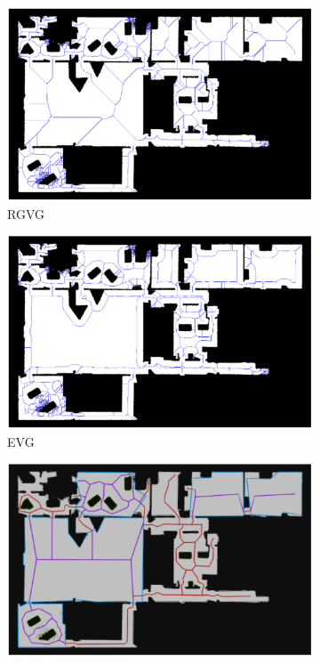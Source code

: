 \begin{figure}[h]
    \captionsetup[subfigure]{justification=centering}
    \centering
    \begin{subfigure}{.5\textwidth}
      \centering
      \includegraphics[width=\textwidth]{figures/60_results/hou2_roadmap_RGVG.png}
      \caption{RGVG \cite{beeson_towards_2005}}
    \end{subfigure}%
    \begin{subfigure}{.5\textwidth}
      \centering
      \includegraphics[width=\textwidth]{figures/60_results/hou2_roadmap_evg.png}
      \caption{EVG \cite{beeson_towards_2005}}
    \end{subfigure}
    \begin{subfigure}{.5\textwidth}
      \centering
      \includegraphics[width=\textwidth]{figures/60_results/hou2_roadmap_htm.png}

\end{subfigure}
\end{figure}
